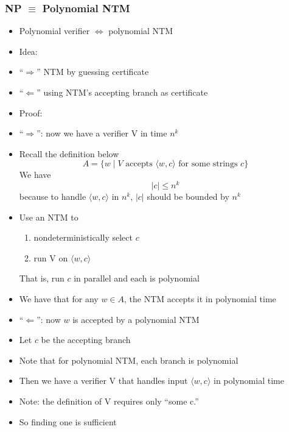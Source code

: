 




\begin{frame}[allowframebreaks] \frametitle{NP $\equiv$ Polynomial NTM}

  \begin{itemize}
\item Polynomial verifier $\Leftrightarrow$ polynomial NTM

\item Idea:

\item [] ``$\Rightarrow$'' NTM by guessing certificate

\item [] ``$\Leftarrow$'' using NTM's accepting branch as  certificate
\item Proof:
\item ``$\Rightarrow$'': now we have a verifier V in time $n^k$

  
\item [] Recall the definition below
    \begin{equation*}
    A=\{w\mid
V \mbox{ accepts } 
\langle  w,c\rangle  
\mbox{ for some strings } c\}
  \end{equation*}
We have
\begin{equation*}
|c|\leq n^k
\end{equation*}
because to handle $\langle  w,c\rangle $ in $n^k$,
$|c|$ should be bounded by $n^k$
\item Use an NTM to
  \begin{enumerate}
  \item nondeterministically select $c$
  \item run V on $\langle  w,c\rangle $
  \end{enumerate}
That is, run $c$ in parallel and each is polynomial
\item We have that for any $w \in A$, the NTM accepts
  it in polynomial time
\item ``$\Leftarrow$'': now $w$ is accepted by a polynomial NTM
\item [] Let $c$ be the accepting branch
\item [] Note that for polynomial NTM, each branch is polynomial
\item Then we have a verifier V that handles input $\langle  w,c\rangle $
in polynomial time

\item Note: the definition of V requires only ``some c.''
\item So finding one is sufficient

\end{itemize}\end{frame}

